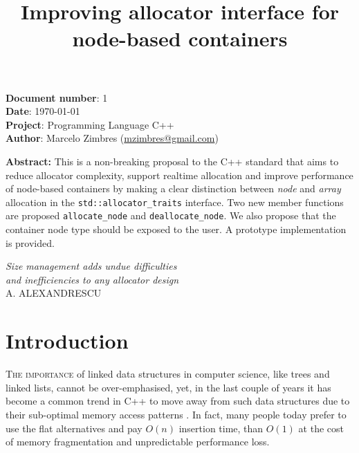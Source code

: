 \documentclass[11pt]{article}
\begin{document}
\date{}
\title{ \bf Improving allocator interface for node-based containers}
\maketitle
\noindent
{\bf Document number}:  1 \\
{\bf Date}:  \today \\
{\bf Project}: Programming Language C++ \\
{\bf Author}: Marcelo Zimbres (\href{mailto:mzimbres@gmail.com}{mzimbres@gmail.com}) 

\vspace{1cm}

\noindent
{\bf Abstract: }This is a non-breaking proposal to the C++ standard that aims
to reduce allocator complexity, support realtime allocation and improve
performance of node-based containers by making a clear distinction between {\it node}
and {\it array} allocation in the \texttt{std::allocator\_traits} interface.
Two new member functions are proposed \texttt{allocate\_node} and
\texttt{deallocate\_node}. We also propose that the container node type should
be exposed to the user. A prototype implementation is provided.

\vfill
\begin{flushright}
\noindent
{\it Size management adds undue difficulties \\
     and inefficiencies to any allocator design} \\
A. ALEXANDRESCU \\
\medskip
{\it }
\end{flushright}
\medskip

\newpage
\tableofcontents

\newpage
\section{Introduction}
\textsc{The importance} of linked data structures in computer science, like
trees and linked lists, cannot be over-emphasised, yet, in the last couple of
years it has become a common trend in C++ to move away from such data
structures due to their sub-optimal memory access patterns \cite{middleditch,
chandler, meyers}.  In fact, many people today prefer to use the flat
alternatives and pay $O(n)$ insertion time, than $O(1)$ at the cost of memory
fragmentation and unpredictable performance loss.  
\end{document}
